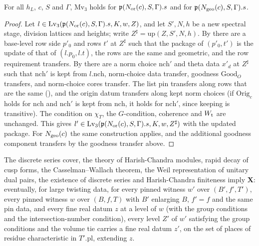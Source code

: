 \begin{proposition}\label{pf:baselat2:lv3mv}
For all $h_L$, $c$, $S$ and $\Gamma$, $\mathrm{Mv}_3$ holds for $\mathfrak{p}(N_{\mathrm{or}}(c),S,\Gamma).s$ and
for $\mathfrak{p}(N_{\mathrm{geo}}(c),S,\Gamma).s$.
\end{proposition}

\begin{proof}
Let $l\in\mathrm{Lv}_3(\mathfrak{p}(N_{\mathrm{or}}(c),S,\Gamma).s,K,w,Z)$, and let $S',N,h$ be a new spectral stage, division
lattices and heights; write $Z^\sharp=\mathrm{up}(Z,S',N,h)$. By
 there are a base-level row side
$p'_0$ and rows $t'$ at $Z^\sharp$ such that the package of $(p'_0,t')$ is the update of that of
$(l.p_0,l.t)$, the rows are the same and geometric, and the row requirement transfers.
By  there are a norm choice $\mathrm{nch}'$ and theta
data $x'_d$ at $Z^\sharp$ such that $\mathrm{nch}'$ is kept from $l.\mathrm{nch}$, norm-choice data transfer, goodness
$\mathrm{Good}_O$ transfers, and norm-choice cores transfer. The list pin transfers along rows that are the
same (), and the origin datum transfers along kept
norm choices (if $\mathrm{Orig}_c$ holds for
$\mathrm{nch}$ and $\mathrm{nch}'$ is kept from $\mathrm{nch}$, it holds for $\mathrm{nch}'$, since keeping is
transitive). The condition on $\chi_T$, the $G$-condition, coherence and $W_{\mathrm{t}}$ are unchanged. This gives
$l'\in\mathrm{Lv}_3(\mathfrak{p}(N_{\mathrm{or}}(c),S,\Gamma).s,K,w,Z^\sharp)$ with the updated package. For
$N_{\mathrm{geo}}(c)$ the same construction applies, and the additional goodness component transfers by the
goodness transfer above.
\end{proof}

\begin{proposition}\label{pf:baselat2:datext}
The discrete series cover, the theory of Harish-Chandra modules, rapid decay of cusp forms, the Casselman--Wallach theorem,
the Weil representation of unitary dual pairs, the existence of discrete series and Harish-Chandra finiteness imply
$\mathbf{X}$: eventually, for large twisting data, for every pinned witness $w'$ over $(B',f',T')$, every
pinned witness $w$ over $(B,f,T)$ with $B'$ enlarging $B$, $f'=f$ and the same pin data, and every fine real
datum $z$ at a level of $w$ (with the group conditions and the intersection-number condition), every level
$Z'$ of $w'$ satisfying the group conditions and the volume tie carries a fine real datum $z'$, on the
set of places of residue characteristic in $T'.\mathrm{pl}$, extending $z$.
\end{proposition}

